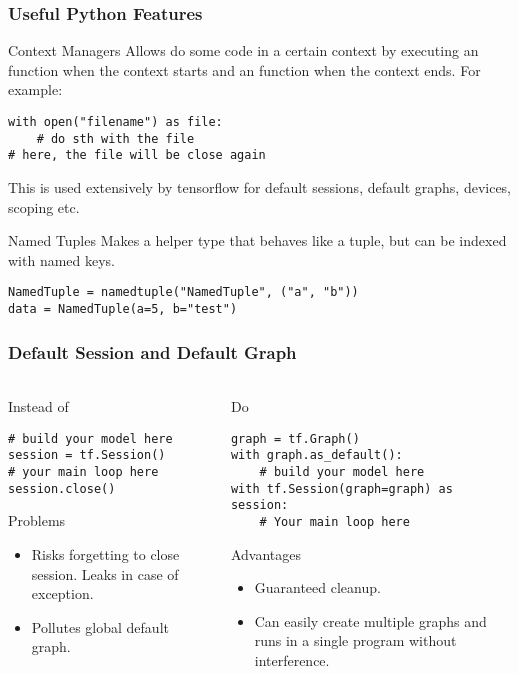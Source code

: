 
\begin{frame}[fragile]
    \frametitle{Useful Python Features}
    \begin{block}{Context Managers}
        Allows do some code in a certain context by executing an  function when the context starts
        and an  function when the context ends. For example:
\begin{lstlisting}
with open("filename") as file:
    # do sth with the file
# here, the file will be close again
\end{lstlisting}
    This is used extensively by tensorflow for default sessions, default graphs, devices, scoping etc.
    \end{block}
    \begin{block}{Named Tuples}
        Makes a helper type that behaves like a tuple, but can be indexed with named keys.
\begin{lstlisting}
NamedTuple = namedtuple("NamedTuple", ("a", "b"))
data = NamedTuple(a=5, b="test")
\end{lstlisting}        
    \end{block}
\end{frame}

\begin{frame}[fragile]
    \frametitle{Default Session and Default Graph}
    \framesubtitle{}
    \begin{columns}
        \begin{column}{0.4\linewidth}
        Instead of 
        \begin{lstlisting}
# build your model here
session = tf.Session()
# your main loop here
session.close()
    \end{lstlisting}
    \begin{block}{Problems}
    \begin{itemize}
        \item Risks forgetting to close session. 
                Leaks in case of exception.
        \item Pollutes global default graph. 
    \end{itemize}
    \end{block}
        \end{column}
        \begin{column}{0.5\linewidth}
        Do
    \begin{lstlisting}
graph = tf.Graph()
with graph.as_default():
    # build your model here
with tf.Session(graph=graph) as session:
    # Your main loop here
    \end{lstlisting}
        \begin{block}{Advantages}
    \begin{itemize}
        \item Guaranteed cleanup.
        \item Can easily create multiple graphs and runs in a single program without interference.
    \end{itemize}
    \end{block}
        \end{column}
    \end{columns}
\end{frame}

